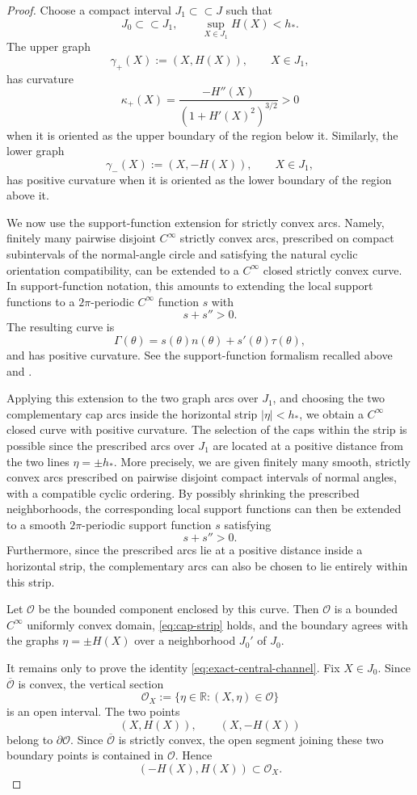 \documentclass[reqno,12pt]{amsart}
\numberwithin{equation}{section}
\theoremstyle{remark}
\begin{document}
\begin{proof}
Choose a compact interval $J_1\subset\subset J$ such that
$$
J_0\subset\subset J_1, \qquad \sup_{X\in J_1}H(X)<h_*.
$$
The upper graph
$$
\gamma_+(X):=(X,H(X)),\qquad X\in J_1,
$$
has curvature
$$
\kappa_+(X)=\frac{-H''(X)}{(1+H'(X)^2)^{3/2}}>0
$$
when it is oriented as the upper boundary of the region below it. Similarly, the lower graph
$$
\gamma_-(X):=(X,-H(X)),\qquad X\in J_1,
$$
has positive curvature when it is oriented as the lower boundary of the region above it.

We now use the support-function extension for strictly convex arcs. Namely, finitely many pairwise disjoint $C^\infty$ strictly convex arcs, prescribed on compact subintervals of the normal-angle circle and satisfying the natural cyclic orientation compatibility, can be extended to a $C^\infty$ closed strictly convex curve. In support-function notation, this amounts to extending the local support functions to a $2\pi$-periodic $C^\infty$ function $s$ with
$$
s+s''>0.
$$
The resulting curve is
$$
\Gamma(\theta)=s(\theta)n(\theta)+s'(\theta)\tau(\theta),
$$
and has positive curvature. See the support-function formalism recalled above and \cite[Section 2.5]{Schneider2013}.

Applying this extension to the two graph arcs over $J_1$, and choosing the two complementary cap arcs inside the horizontal strip $|\eta|<h_*$, we obtain a $C^\infty$ closed curve with positive curvature. The selection of the caps within the strip is possible since the prescribed arcs over $J_1$ are located at a positive distance from the two lines $\eta = \pm h_*$. More precisely, we are given finitely many smooth, strictly convex arcs prescribed on pairwise disjoint compact intervals of normal angles, with a compatible cyclic ordering. 
By possibly shrinking the prescribed neighborhoods, the corresponding local support functions can then be extended to a smooth $2\pi$-periodic support function $s$ satisfying
$$
s + s'' > 0.
$$
Furthermore, since the prescribed arcs lie at a positive distance inside a horizontal strip, the complementary arcs can also be chosen to lie entirely within this strip.


Let $\mathcal O$ be the bounded component enclosed by this curve. Then $\mathcal O$ is a bounded $C^\infty$ uniformly convex domain, \eqref{eq:cap-strip} holds, and the boundary agrees with the graphs $\eta=\pm H(X)$ over a neighborhood $J_0'$ of $J_0$.

It remains only to prove the identity \eqref{eq:exact-central-channel}. Fix $X\in J_0$. Since $\overline{\mathcal O}$ is convex, the vertical section
$$
\mathcal O_X:=\{\eta\in\mathbb R:(X,\eta)\in\mathcal O\}
$$
is an open interval. The two points
$$
(X,H(X)),\qquad (X,-H(X))
$$
belong to $\partial\mathcal O$. Since $\overline{\mathcal O}$ is strictly convex, the open segment joining these two boundary points is contained in $\mathcal O$. Hence
$$
(-H(X),H(X))\subset \mathcal O_X.
$$


\end{proof}
\end{document}
